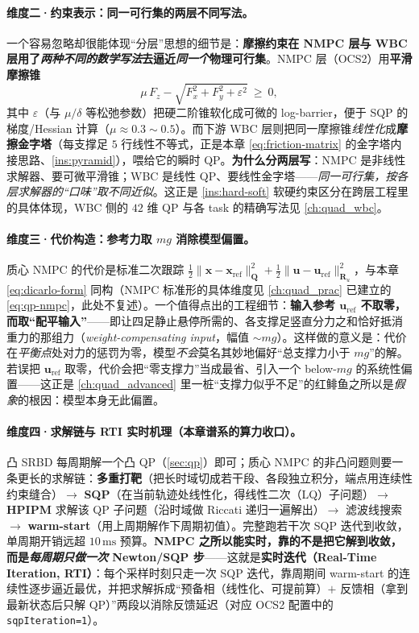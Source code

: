 \paragraph{维度二·约束表示：同一可行集的两层不同写法。}
一个容易忽略却很能体现“分层”思想的细节是：\textbf{摩擦约束在 NMPC 层与 WBC 层用了\emph{两种不同的数学写法}去逼近\emph{同一个}物理可行集}。NMPC 层（OCS2）用\textbf{平滑摩擦锥}
\begin{equation}
  \mu\,F_z-\sqrt{F_x^2+F_y^2+\varepsilon^2}\ \ge\ 0,
  \label{eq:smooth-friction-cone}
\end{equation}
其中 $\varepsilon$（与 $\mu/\delta$ 等松弛参数）把硬二阶锥软化成可微的 log-barrier，便于 SQP 的梯度/Hessian 计算（$\mu\approx0.3\!\sim\!0.5$）。而下游 WBC 层则把同一摩擦锥\emph{线性化}成\textbf{摩擦金字塔}（每支撑足 $5$ 行线性不等式，正是本章 \cref{eq:friction-matrix} 的金字塔内接思路、\cref{ins:pyramid}），喂给它的瞬时 QP。\textbf{为什么分两层写}：NMPC 是非线性求解器、要可微平滑锥；WBC 是线性 QP、要线性金字塔——\emph{同一可行集，按各层求解器的“口味”取不同近似}。这正是 \cref{ins:hard-soft} 软硬约束区分在跨层工程里的具体体现，WBC 侧的 $42$ 维 QP 与各 task 的精确写法见 \cref{ch:quad_wbc}。

\paragraph{维度三·代价构造：参考力取 $mg$ 消除模型偏置。}
质心 NMPC 的代价是标准二次跟踪 $\tfrac12\|\mathbf{x}-\mathbf{x}_{\text{ref}}\|_{\mathbf{Q}}^2+\tfrac12\|\mathbf{u}-\mathbf{u}_{\text{ref}}\|_{\mathbf{R}_u}^2$，与本章 \cref{eq:dicarlo-form} 同构（NMPC 标准形的具体维度见 \cref{ch:quad_prac} 已建立的 \cref{eq:qp-nmpc}，此处不复述）。一个值得点出的工程细节：\textbf{输入参考 $\mathbf{u}_{\text{ref}}$ 不取零，而取“配平输入”}——即让四足静止悬停所需的、各支撑足竖直分力之和恰好抵消重力的那组力（\emph{weight-compensating input}，幅值 $\sim mg$）。这样做的意义是：代价在\emph{平衡点}处对力的惩罚为零，模型\emph{不会}莫名其妙地偏好“总支撑力小于 $mg$”的解。若误把 $\mathbf{u}_{\text{ref}}$ 取零，代价会把“零支撑力”当成最省、引入一个 below-$mg$ 的系统性偏置——这正是 \cref{ch:quad_advanced} 里一桩“支撑力似乎不足”的红鲱鱼之所以是\emph{假象}的根因：模型本身无此偏置。

\paragraph{维度四·求解链与 RTI 实时机理（本章谱系的算力收口）。}
凸 SRBD 每周期解一个凸 QP（\cref{sec:qp}）即可；质心 NMPC 的非凸问题则要一条更长的求解链：\textbf{多重打靶}（把长时域切成若干段、各段独立积分，端点用连续性约束缝合）$\to$ \textbf{SQP}（在当前轨迹处线性化，得线性二次（LQ）子问题）$\to$ \textbf{HPIPM} 求解该 QP 子问题（沿时域做 Riccati 递归一遍解出）$\to$ 滤波线搜索 $\to$ \textbf{warm-start}（用上周期解作下周期初值）。完整跑若干次 SQP 迭代到收敛，单周期开销远超 $10\,\mathrm{ms}$ 预算。\textbf{NMPC 之所以能实时，靠的不是把它解到收敛，而是\emph{每周期只做一次} Newton/SQP 步}——这就是\textbf{实时迭代（Real-Time Iteration, RTI）}\cite{diehl2002realtime,gros2020linear}：每个采样时刻只走一次 SQP 迭代，靠周期间 warm-start 的连续性逐步逼近最优，并把求解拆成“预备相（线性化、可提前算）$+$ 反馈相（拿到最新状态后只解 QP）”两段以消除反馈延迟（对应 OCS2 配置中的 \texttt{sqpIteration=1}）。

